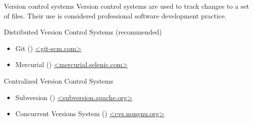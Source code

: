 \begin{block}{Version control systems}
  Version control systems are used to track changes to a set of files. Their use is considered professional software development practice.
  \begin{indented_itemize}
  \item Distributed Version Control Systems (recommended)
    \begin{itemize}
    \item Git () \url{<git-scm.com>}
    \item Mercurial () \url{<mercurial.selenic.com>}
    \end{itemize}
  \item Centralized Version Control Systems
    \begin{itemize}
    \item Subversion () \url{<subversion.apache.org>}
    \item Concurrent Versions System () \url{<cvs.nongnu.org>}
    \end{itemize}
  \end{indented_itemize}
\end{block}
